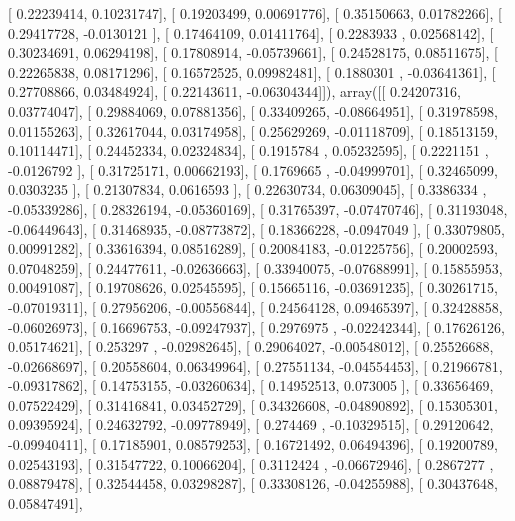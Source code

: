 \documentclass{article}
\begin{document}
       [ 0.22239414,  0.10231747],
       [ 0.19203499,  0.00691776],
       [ 0.35150663,  0.01782266],
       [ 0.29417728, -0.0130121 ],
       [ 0.17464109,  0.01411764],
       [ 0.2283933 ,  0.02568142],
       [ 0.30234691,  0.06294198],
       [ 0.17808914, -0.05739661],
       [ 0.24528175,  0.08511675],
       [ 0.22265838,  0.08171296],
       [ 0.16572525,  0.09982481],
       [ 0.1880301 , -0.03641361],
       [ 0.27708866,  0.03484924],
       [ 0.22143611, -0.06304344]]), array([[ 0.24207316,  0.03774047],
       [ 0.29884069,  0.07881356],
       [ 0.33409265, -0.08664951],
       [ 0.31978598,  0.01155263],
       [ 0.32617044,  0.03174958],
       [ 0.25629269, -0.01118709],
       [ 0.18513159,  0.10114471],
       [ 0.24452334,  0.02324834],
       [ 0.1915784 ,  0.05232595],
       [ 0.2221151 , -0.0126792 ],
       [ 0.31725171,  0.00662193],
       [ 0.1769665 , -0.04999701],
       [ 0.32465099,  0.0303235 ],
       [ 0.21307834,  0.0616593 ],
       [ 0.22630734,  0.06309045],
       [ 0.3386334 , -0.05339286],
       [ 0.28326194, -0.05360169],
       [ 0.31765397, -0.07470746],
       [ 0.31193048, -0.06449643],
       [ 0.31468935, -0.08773872],
       [ 0.18366228, -0.0947049 ],
       [ 0.33079805,  0.00991282],
       [ 0.33616394,  0.08516289],
       [ 0.20084183, -0.01225756],
       [ 0.20002593,  0.07048259],
       [ 0.24477611, -0.02636663],
       [ 0.33940075, -0.07688991],
       [ 0.15855953,  0.00491087],
       [ 0.19708626,  0.02545595],
       [ 0.15665116, -0.03691235],
       [ 0.30261715, -0.07019311],
       [ 0.27956206, -0.00556844],
       [ 0.24564128,  0.09465397],
       [ 0.32428858, -0.06026973],
       [ 0.16696753, -0.09247937],
       [ 0.2976975 , -0.02242344],
       [ 0.17626126,  0.05174621],
       [ 0.253297  , -0.02982645],
       [ 0.29064027, -0.00548012],
       [ 0.25526688, -0.02668697],
       [ 0.20558604,  0.06349964],
       [ 0.27551134, -0.04554453],
       [ 0.21966781, -0.09317862],
       [ 0.14753155, -0.03260634],
       [ 0.14952513,  0.073005  ],
       [ 0.33656469,  0.07522429],
       [ 0.31416841,  0.03452729],
       [ 0.34326608, -0.04890892],
       [ 0.15305301,  0.09395924],
       [ 0.24632792, -0.09778949],
       [ 0.274469  , -0.10329515],
       [ 0.29120642, -0.09940411],
       [ 0.17185901,  0.08579253],
       [ 0.16721492,  0.06494396],
       [ 0.19200789,  0.02543193],
       [ 0.31547722,  0.10066204],
       [ 0.3112424 , -0.06672946],
       [ 0.2867277 ,  0.08879478],
       [ 0.32544458,  0.03298287],
       [ 0.33308126, -0.04255988],
       [ 0.30437648,  0.05847491],
\end{document}
